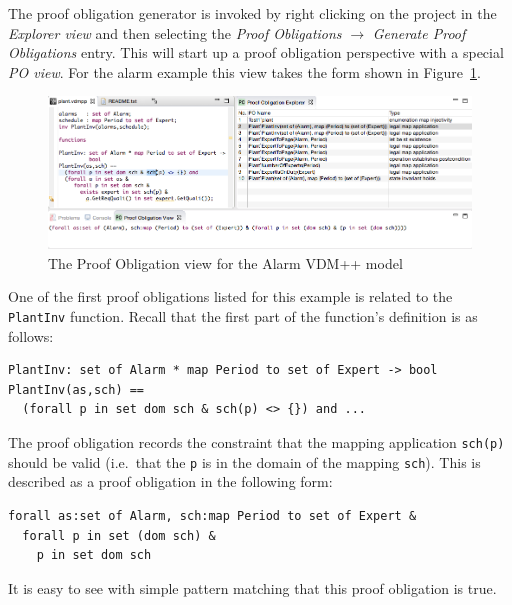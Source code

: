 The proof obligation generator is invoked by right clicking on the project in the \emph{Explorer view} and then selecting the \emph{Proof Obligations} $\rightarrow$ \emph{Generate Proof Obligations} entry. This will start up a proof obligation perspective with a special \emph{PO view}. For the alarm example this view takes the form shown in Figure~\ref{fig:POview}.
%
\begin{figure}[htbp]
\begin{center}
\includegraphics[width=4.5in]{figures/poview}
\caption{The Proof Obligation view for the Alarm VDM++ model\label{fig:POview}}
\end{center}
\end{figure}
%
One of the first proof obligations listed for this example is related to the \texttt{PlantInv} function. Recall that the first part of the function's definition is as follows:

\begin{lstlisting}
PlantInv: set of Alarm * map Period to set of Expert -> bool
PlantInv(as,sch) ==
  (forall p in set dom sch & sch(p) <> {}) and ...
\end{lstlisting}


The proof obligation records the constraint that the mapping application \texttt{sch(p)} should be valid (i.e.\ that the \texttt{p} is in the domain of the mapping \texttt{sch}). This is described as a proof obligation in the following form:

\begin{lstlisting}
forall as:set of Alarm, sch:map Period to set of Expert &
  forall p in set (dom sch) &
    p in set dom sch
\end{lstlisting}
It is easy to see with simple pattern matching that this proof obligation is true.

